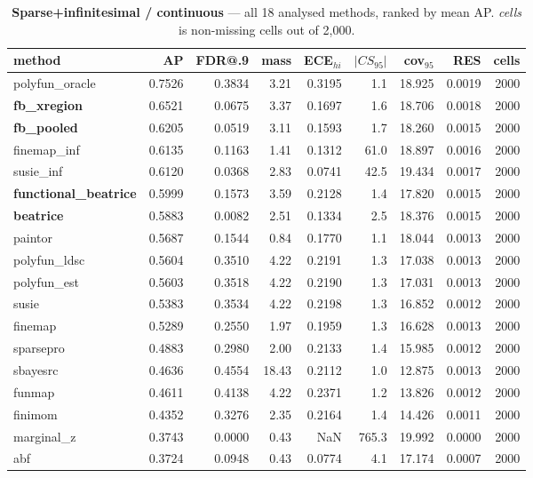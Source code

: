 \begin{table}[htbp]\centering\small
\caption{\textbf{Sparse+infinitesimal / continuous} --- all 18 analysed methods, ranked by mean AP. \emph{cells} is non-missing cells out of 2{,}000.}
\label{tab:main-sparse_inf-continuous}
\begin{tabular}{lrrrrrrr r}\toprule
method & AP & FDR@.9 & mass & ECE$_{hi}$ & $|CS_{95}|$ & cov$_{95}$ & RES & cells\\\midrule
polyfun\_oracle & 0.7526 & 0.3834 & 3.21 & 0.3195 & 1.1 & 18.925 & 0.0019 & 2000\\
\textbf{fb\_xregion} & 0.6521 & 0.0675 & 3.37 & 0.1697 & 1.6 & 18.706 & 0.0018 & 2000\\
\textbf{fb\_pooled} & 0.6205 & 0.0519 & 3.11 & 0.1593 & 1.7 & 18.260 & 0.0015 & 2000\\
finemap\_inf & 0.6135 & 0.1163 & 1.41 & 0.1312 & 61.0 & 18.897 & 0.0016 & 2000\\
susie\_inf & 0.6120 & 0.0368 & 2.83 & 0.0741 & 42.5 & 19.434 & 0.0017 & 2000\\
\textbf{functional\_beatrice} & 0.5999 & 0.1573 & 3.59 & 0.2128 & 1.4 & 17.820 & 0.0015 & 2000\\
\textbf{beatrice} & 0.5883 & 0.0082 & 2.51 & 0.1334 & 2.5 & 18.376 & 0.0015 & 2000\\
paintor & 0.5687 & 0.1544 & 0.84 & 0.1770 & 1.1 & 18.044 & 0.0013 & 2000\\
polyfun\_ldsc & 0.5604 & 0.3510 & 4.22 & 0.2191 & 1.3 & 17.038 & 0.0013 & 2000\\
polyfun\_est & 0.5603 & 0.3518 & 4.22 & 0.2190 & 1.3 & 17.031 & 0.0013 & 2000\\
susie & 0.5383 & 0.3534 & 4.22 & 0.2198 & 1.3 & 16.852 & 0.0012 & 2000\\
finemap & 0.5289 & 0.2550 & 1.97 & 0.1959 & 1.3 & 16.628 & 0.0013 & 2000\\
sparsepro & 0.4883 & 0.2980 & 2.00 & 0.2133 & 1.4 & 15.985 & 0.0012 & 2000\\
sbayesrc & 0.4636 & 0.4554 & 18.43 & 0.2112 & 1.0 & 12.875 & 0.0013 & 2000\\
funmap & 0.4611 & 0.4138 & 4.22 & 0.2371 & 1.2 & 13.826 & 0.0012 & 2000\\
finimom & 0.4352 & 0.3276 & 2.35 & 0.2164 & 1.4 & 14.426 & 0.0011 & 2000\\
marginal\_z & 0.3743 & 0.0000 & 0.43 & NaN & 765.3 & 19.992 & 0.0000 & 2000\\
abf & 0.3724 & 0.0948 & 0.43 & 0.0774 & 4.1 & 17.174 & 0.0007 & 2000\\
\bottomrule\end{tabular}\end{table}
